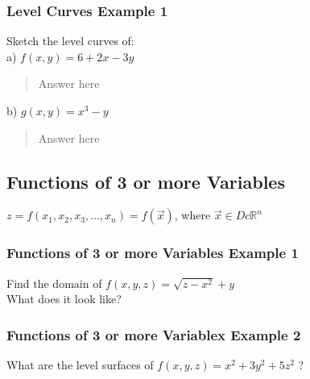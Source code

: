 \documentclass[12pt]{article}
\begin{document}
\subsubsection{Level Curves Example 1}
Sketch the level curves of: \\%
a) \(f(x,y) = 6+2x-3y\)
\begin{quote}
	Answer here
\end{quote}
b) \(g(x,y) = x^3-y\) 
\begin{quote}
	Answer here
\end{quote}

\subsection{Functions of 3 or more Variables}
\(z=f(x_1,x_2,x_3,...,x_n) = f(\vec{x} ) \), where \(\vec{x} \in D c \mathbb{R}^n \)  
\subsubsection{Functions of 3 or more Variables Example 1}
Find the domain of \(f(x,y,z) = \sqrt{z-x^2}+y\) \\%
What does it look like?

\subsubsection{Functions of 3 or more Variablex Example 2}
What are the level surfaces of \(f(x,y,z)=x^2+3y^2+5z^2\) ?
\end{document}
